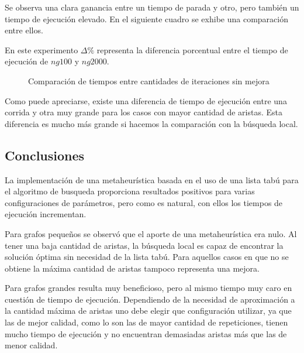 Se observa una clara ganancia entre un tiempo de parada y otro, pero también
un tiempo de ejecución elevado. En el siguiente cuadro se exhibe una
comparación entre ellos.

En este experimento $\Delta\%$ representa la diferencia porcentual entre el
tiempo de ejecución de $ng 100$ y $ng 2000$.

\begin{figure}[H]
    \centering
    \caption{Comparación de tiempos entre cantidades de iteraciones sin mejora}
    \pgfplotstabletypeset[
        columns={0, localsearchtime, highiterationlowernogainlowaspirationtime, highiterationhighnogainlowaspirationtime, rationogaintime}
    ]{\optimalsolutions}
\end{figure}

Como puede apreciarse, existe una diferencia de tiempo de ejecución entre una
corrida y otra muy grande para los casos con mayor cantidad de aristas.
Esta diferencia es mucho más grande si hacemos la comparación con la búsqueda
local.

\subsection{Conclusiones}

La implementación de una metaheurística basada en el uso de una lista tabú para el algoritmo de busqueda proporciona resultados positivos para varias configuraciones de parámetros, pero como es natural, con ellos los tiempos de ejecución incrementan.

Para grafos pequeños se observó que el aporte de una metaheurística era nulo.
Al tener una baja cantidad de aristas, la búsqueda local es capaz de encontrar
la solución óptima sin necesidad de la lista tabú. Para aquellos casos en
que no se obtiene la máxima cantidad de aristas tampoco representa una mejora.

Para grafos grandes resulta muy beneficioso, pero al mismo tiempo muy caro en cuestión de tiempo de ejecución. Dependiendo de la necesidad de aproximación a la cantidad máxima de aristas uno debe elegir que configuración utilizar, ya que las de mejor calidad, como lo son las de mayor cantidad de repeticiones, tienen mucho tiempo de ejecución y no encuentran demasiadas aristas más que las de menor calidad.